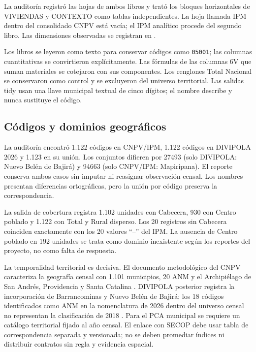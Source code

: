 \documentclass[11pt,a4paper]{article}
\begin{document}
La auditoría registró las hojas de ambos libros y trató los bloques horizontales de VIVIENDAS y CONTEXTO como tablas independientes. La hoja llamada IPM dentro del consolidado CNPV está vacía; el IPM analítico procede del segundo libro. Las dimensiones observadas se registran en .

Los libros se leyeron como texto para conservar códigos como \texttt{05001}; las columnas cuantitativas se convirtieron explícitamente. Las fórmulas de las columnas 6V que suman materiales se cotejaron con sus componentes. Los renglones Total Nacional se conservaron como control y se excluyeron del universo territorial. Las salidas tidy usan una llave municipal textual de cinco dígitos; el nombre describe y nunca sustituye el código.

\subsection{Códigos y dominios geográficos}

La auditoría encontró 1.122 códigos en CNPV/IPM, 1.122 códigos en DIVIPOLA 2026 y 1.123 en su unión. Los conjuntos difieren por 27493 (solo DIVIPOLA: Nuevo Belén de Bajirá) y 94663 (solo CNPV/IPM: Mapiripana). El reporte conserva ambos casos sin imputar ni reasignar observación censal. Los nombres presentan diferencias ortográficas, pero la unión por código preserva la correspondencia.

La salida de cobertura registra 1.102 unidades con Cabecera, 930 con Centro poblado y 1.122 con Total y Rural disperso. Los 20 registros sin Cabecera coinciden exactamente con los 20 valores “--” del IPM. La ausencia de Centro poblado en 192 unidades se trata como dominio inexistente según los reportes del proyecto, no como falta de respuesta.

La temporalidad territorial es decisiva. El documento metodológico del CNPV caracteriza la geografía censal con 1.101 municipios, 20 ANM y el Archipiélago de San Andrés, Providencia y Santa Catalina \citep{dane_cnpv_2018}. DIVIPOLA posterior registra la incorporación de Barrancominas y Nuevo Belén de Bajirá; los 18 códigos identificados como ANM en la nomenclatura de 2026 dentro del universo censal no representan la clasificación de 2018 \citep{dane_divipola,dane_elic_2025}. Para el PCA municipal se requiere un catálogo territorial fijado al año censal. El enlace con SECOP debe usar tabla de correspondencia separada y versionada; no se deben promediar índices ni distribuir contratos sin regla y evidencia espacial.
\end{document}
